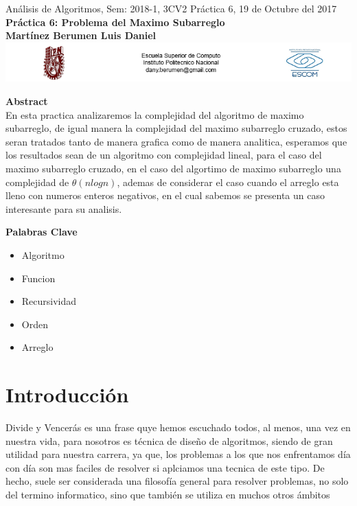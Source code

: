 \documentclass[spanish]{article}
\begin{document}
	\setmarginsrb{30mm}{30mm}{30mm}{30mm}{0pt}{0mm}{0pt}{0mm}
	
	\begin{center}
	{\Large Análisis de Algoritmos, Sem: 2018-1, 3CV2 Práctica 6, 19 de Octubre del 2017}\\
{\huge {\bf Práctica 6: Problema del Maximo Subarreglo}} \\
{\huge {\bf Martínez Berumen Luis Daniel}} \\
\includegraphics[width=1\textwidth, right]{./imagenes/logos.png}
	\end{center}
	
	\bigskip
	
	\bigskip
	
	\bigskip
	
	{\LARGE {\bf Abstract}}\\
	
	En esta practica analizaremos la complejidad del algoritmo de maximo subarreglo, de igual manera la complejidad del maximo subarreglo cruzado, estos seran tratados tanto de manera grafica como de manera analitica, esperamos que los resultados sean de un algoritmo con complejidad lineal, para el caso del maximo subarreglo cruzado, en el caso del algortimo de maximo subarreglo una complejidad de $\theta(nlogn)$, ademas de considerar el caso cuando el arreglo esta lleno con numeros enteros negativos, en el cual sabemos se presenta un caso interesante para su analisis.

	\bigskip

	{\Large {\bf Palabras Clave}}\\
	\begin{itemize}
		\item Algoritmo
		\item Funcion
		\item Recursividad
		\item Orden
		\item Arreglo
	\end{itemize}

	\section{Introducci\'on}
Divide y Vencerás es una frase quye hemos escuchado todos, al menos, una vez en nuestra vida, para nosotros 
	es técnica de diseño de algoritmos, siendo de gran utilidad para nuestra carrera, ya que, 
	los problemas a los que nos enfrentamos día con día son mas faciles de resolver si aplciamos una tecnica de este tipo.
	De hecho, suele ser considerada una filosofía general para resolver problemas, no solo del termino informatico, sino que también           se utiliza en muchos otros ámbitos
\end{document}
